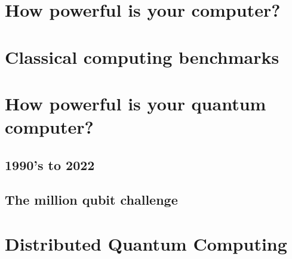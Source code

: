 \documentclass{book}
\begin{document}
\section{How powerful is your computer?}

\section{Classical computing benchmarks}

\section{How powerful is your quantum computer?}

\subsection{1990's to 2022}

\subsection{The million qubit challenge}

\section{Distributed Quantum Computing}
\end{document}

